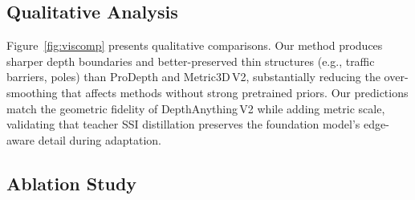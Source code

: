\subsection{Qualitative Analysis}

Figure~\ref{fig:viscomp} presents qualitative comparisons. Our method produces sharper depth boundaries and better-preserved thin structures (e.g., traffic barriers, poles) than ProDepth and Metric3D\,V2, substantially reducing the over-smoothing that affects methods without strong pretrained priors. Our predictions match the geometric fidelity of DepthAnything\,V2 while adding metric scale, validating that teacher SSI distillation preserves the foundation model's edge-aware detail during adaptation.

\subsection{Ablation Study}

